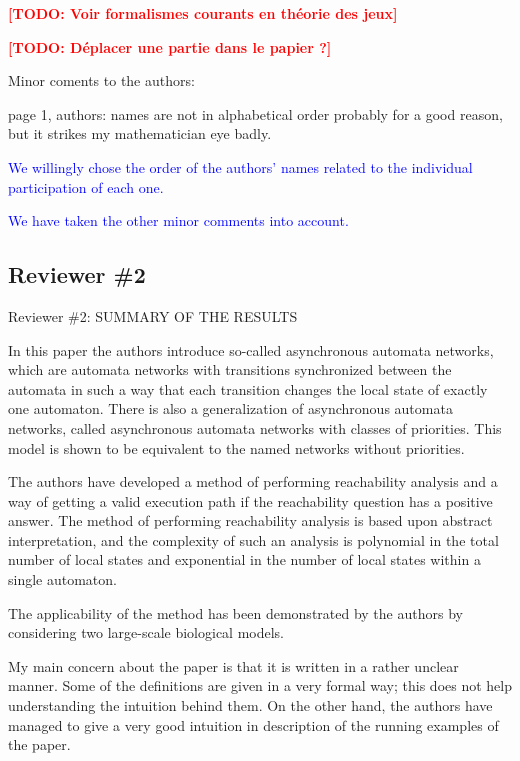 \documentclass[11pt]{article}
\newcommand{\todo}[1]{\textcolor{red}{\textbf{[TODO: #1]}}}
\newcommand{\ilanswer}[1]{\textcolor{blue}{#1}}
\newcommand{\answer}[1]{\ilanswer{#1}\vspace*{1em}}
\begin{document}
\todo{Voir formalismes courants en théorie des jeux}

\todo{Déplacer une partie dans le papier ?}



Minor coments to the authors:

page 1, authors: names are not in alphabetical order probably for a good reason, but it strikes my mathematician eye badly.

\answer{We willingly chose the order of the authors' names related to the individual participation of each one.}

\answer{We have taken the other minor comments into account.}






\subsection*{Reviewer \#2}



Reviewer \#2: SUMMARY OF THE RESULTS

In this paper the authors introduce so-called asynchronous automata networks, which are automata networks with transitions synchronized between the automata in such a way that each transition changes the local state of exactly one automaton. There is also a generalization of asynchronous automata networks, called asynchronous automata networks with classes of priorities. This model is shown to be equivalent to the named networks without priorities.

The authors have developed a method of performing reachability analysis and a way of getting a valid execution path if the reachability question has a positive answer. The method of performing reachability analysis is based upon abstract interpretation, and the complexity of such an analysis is polynomial in the total number of local states and exponential in the number of local states within a single automaton.

The applicability of the method has been demonstrated by the authors by considering two large-scale biological models.

My main concern about the paper is that it is written in a rather unclear manner. Some of the definitions are given in a very formal way; this does not help understanding the intuition behind them. On the other hand, the authors have managed to give a very good intuition in description of the running examples of the paper.
\end{document}

